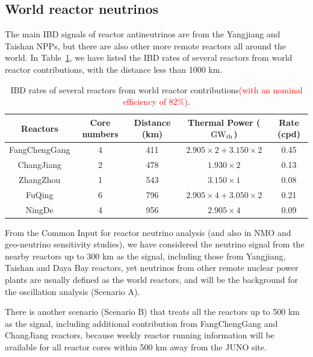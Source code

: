 \subsection{World reactor neutrinos}

The main IBD signals of reactor antineutrinos are from the Yangjiang and Taishan NPPs, but there are also other more remote reactors all around the world.
In Table~\ref{tab:WR-1000}, we have listed the IBD rates of several reactors from world reactor contributions, with the distance less than 1000 km.
\begin{table}[!htbp]
    \caption{IBD rates of several reactors from world reactor contributions\textcolor{red}{(with an nominal efficiency of 82\%)}.}
    \label{tab:WR-1000}
    \centering
    \footnotesize%
    \setlength{\tabcolsep}{4pt}%
    \renewcommand{\arraystretch}{1.2}%
    \begin{tabular}{c|c|c|c|c}
        \hline
        Reactors & Core numbers & Distance (km) & Thermal Power (${\rm GW}_{\rm th}$) & Rate (cpd)\\ \hline
        FangChengGang & 4 & 411 & $2.905\times2+3.150\times2$ & 0.45\\
        ChangJiang & 2 & 478 & $1.930\times2$ & 0.13\\
        ZhangZhou & 1 & 543 & $3.150\times1$ & 0.08 \\
        FuQing & 6 & 796 & $2.905\times4+3.050\times2$ & 0.21 \\
        NingDe & 4 & 956 & $2.905\times4$ & 0.09\\
        \hline 
    \end{tabular}
\end{table}

From the Common Input for reactor neutrino analysis (and also in NMO and geo-neutrino sensitivity studies), we have considered the neutrino signal from the nearby reactors up to 300 km as the signal, including those from Yangjiang, Taishan and Daya Bay reactors, yet neutrinos from other remote nuclear power plants are usually defined as the world reactors, and will be the background for the oscillation analysis (Scenario A).

There is another scenario (Scenario B) that treats all the reactors up to 500 km as the signal, including additional contribution from FangChengGang and ChangJiang reactors, because weekly reactor running information will be available for all reactor cores within 500 km away from the JUNO site.

